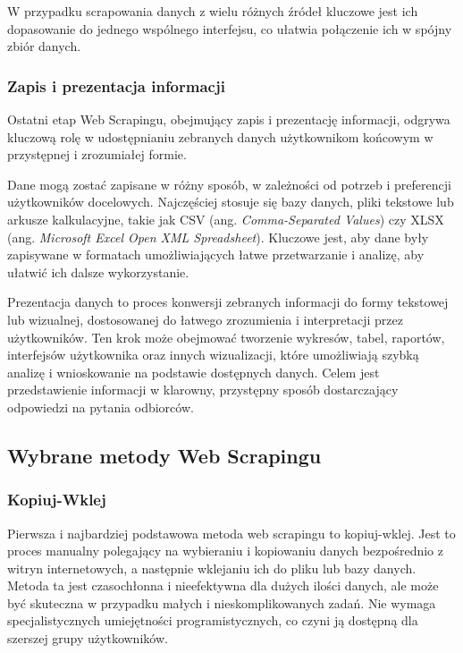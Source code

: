\noindent W przypadku scrapowania danych z wielu różnych źródeł kluczowe jest ich dopasowanie do jednego wspólnego interfejsu, co ułatwia połączenie ich w spójny zbiór danych.

\subsubsection{Zapis i prezentacja informacji}

Ostatni etap Web Scrapingu, obejmujący zapis i prezentację informacji, odgrywa kluczową rolę w udostępnianiu zebranych danych użytkownikom końcowym w przystępnej i zrozumiałej formie\cite{iee-state-of-the-art}.

Dane mogą zostać zapisane w różny sposób, w zależności od potrzeb i preferencji użytkowników docelowych.
Najczęściej stosuje się bazy danych, pliki tekstowe lub arkusze kalkulacyjne, takie jak CSV (ang. \emph{Comma-Separated Values}) czy XLSX (ang. \emph{Microsoft Excel Open XML Spreadsheet}).
Kluczowe jest, aby dane były zapisywane w formatach umożliwiających łatwe przetwarzanie i analizę, aby ułatwić ich dalsze wykorzystanie\cite{iee-state-of-the-art}.

Prezentacja danych to proces konwersji zebranych informacji do formy tekstowej lub wizualnej, dostosowanej do łatwego zrozumienia i interpretacji przez użytkowników.
Ten krok może obejmować tworzenie wykresów, tabel, raportów, interfejsów użytkownika oraz innych wizualizacji, które umożliwiają szybką analizę i wnioskowanie na podstawie dostępnych danych.
Celem jest przedstawienie informacji w klarowny, przystępny sposób dostarczający odpowiedzi na pytania odbiorców.

\subsection{Wybrane metody Web Scrapingu}\label{subsec:web-scraping-methods}

\subsubsection{Kopiuj-Wklej}

Pierwsza i najbardziej podstawowa metoda web scrapingu to kopiuj-wklej.
Jest to proces manualny polegający na wybieraniu i kopiowaniu danych bezpośrednio z witryn internetowych, a następnie wklejaniu ich do pliku lub bazy danych.
Metoda ta jest czasochłonna i nieefektywna dla dużych ilości danych, ale może być skuteczna w przypadku małych i nieskomplikowanych zadań\cite{state-of-art}.
Nie wymaga specjalistycznych umiejętności programistycznych, co czyni ją dostępną dla szerszej grupy użytkowników.

